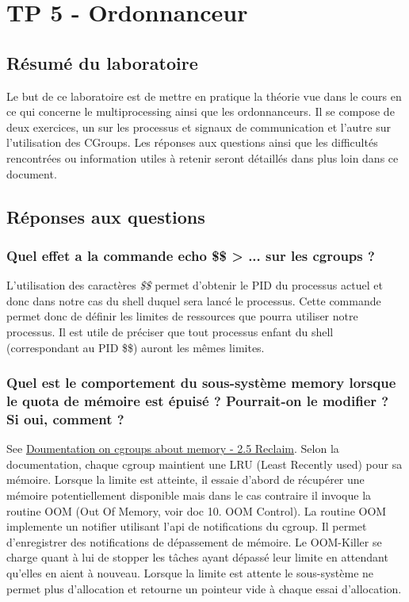 \documentclass{ReportTemplate}
\begin{document}
\chapter{TP 5 - Ordonnanceur}
\section{Résumé du laboratoire}
Le but de ce laboratoire est de mettre en pratique la théorie vue dans le cours
en ce qui concerne le multiprocessing ainsi que les ordonnanceurs. Il se compose
de deux exercices, un sur les processus et signaux de communication et l'autre
sur l'utilisation des CGroups. Les réponses aux questions ainsi que les
difficultés rencontrées ou information utiles à retenir seront détaillés dans
plus loin dans ce document.

\section{Réponses aux questions}
\subsection{Quel effet a la commande echo \$\$ > ... sur les cgroups ?}
L'utilisation des caractères \textit{\$\$} permet d'obtenir le PID du processus
actuel et donc dans notre cas du shell duquel sera lancé le processus. Cette
commande permet donc de définir les limites de ressources que pourra utiliser
notre processus. Il est utile de préciser que tout processus enfant du shell
(correspondant au PID \$\$) auront les mêmes limites.
\subsection{Quel est le comportement du sous-système memory lorsque le quota de mémoire est épuisé ? Pourrait-on le modifier ? Si oui, comment ?}
See
\href{https://www.kernel.org/doc/Documentation/cgroup-v1/memory.txt}{Doumentation
on cgroups about memory - 2.5 Reclaim}.\newline
Selon la documentation, chaque cgroup maintient une LRU (Least Recently used)
pour sa mémoire. Lorsque la limite est atteinte, il essaie d'abord de récupérer
une mémoire potentiellement disponible mais dans le cas contraire il invoque la
routine OOM (Out Of Memory, voir doc 10. OOM Control). La routine OOM implemente
un notifier utilisant l'api de notifications du cgroup. Il permet d'enregistrer
des notifications de dépassement de mémoire. Le OOM-Killer se charge quant à lui
de stopper les tâches ayant dépassé leur limite en attendant qu'elles en aient à
nouveau.\newline
Lorsque la limite est attente le sous-système ne permet plus d'allocation et
retourne un pointeur vide à chaque essai d'allocation.
\end{document}
